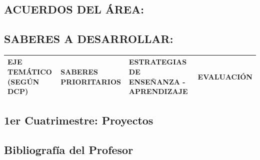 \documentclass[../main.tex]{subfiles}
\begin{document}
\subsection*{ACUERDOS DEL ÁREA:}

\subsection*{SABERES A DESARROLLAR:}
\begin{longtable}[h!]{|p{3cm}|p{6cm}|p{6cm}|p{3cm}|}
	\hline
	EJE TEMÁTICO (SEGÚN DCP) & SABERES PRIORITARIOS & ESTRATEGIAS DE ENSEÑANZA - APRENDIZAJE & EVALUACIÓN \\
	\hline
	\endhead
	\hline
\end{longtable}

\subsection*{1er Cuatrimestre: Proyectos}

\subsection*{Bibliografía del Profesor}
\end{document}
